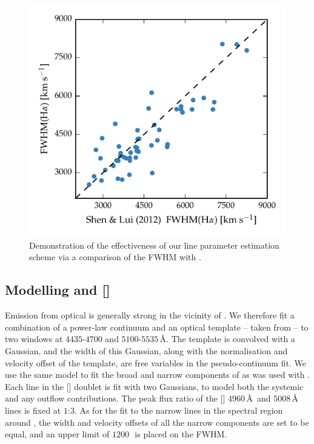\begin{figure}
    \centering
    \includegraphics[width=0.8\linewidth]{figures/chapter03/shen_comparison_ha.pdf}
    \caption[{Demonstration of the effectiveness of \ha line parameter estimation scheme.}]{Demonstration of the effectiveness of our line parameter estimation scheme via a comparison of the \ha FWHM with \citet{shen12}.}
    \label{fig:shen_comparison_ha}
\end{figure}

\subsection{Modelling \hb and []}
\label{sec:hb}

Emission from optical  is generally strong in the vicinity of \hbns.
We therefore fit a combination of a power-law continuum and an optical  template -- taken from \citet{boroson92} -- to two windows at $4435$-$4700$ and $5100$-$5535$\,\AA.
The  template is convolved with a Gaussian, and the width of this Gaussian, along with the normalisation and velocity offset of the  template, are free variables in the pseudo-continuum fit.
We use the same model to fit the broad and narrow components of \hb as was used with \hans.
Each line in the [] doublet is fit with two Gaussians, to model both the systemic and any outflow contributions.
The peak flux ratio of the [] $4960$\,\AA\, and $5008$\,\AA\, lines is fixed at $1$:$3$.
As for the fit to the narrow lines in the spectral region around \hans, the width and velocity offsets of all the narrow components are set to be equal, and an upper limit of $1200$\,\kms\, is placed on the FWHM.

